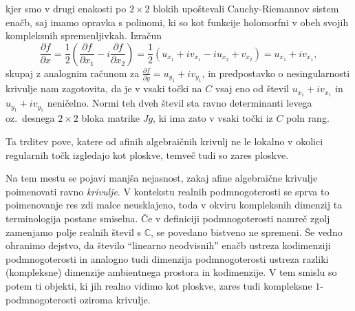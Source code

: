 \documentclass[mat1]{fmfdelo}
\numberwithin{equation}{section}
\newcommand{\R}{\mathbb R}
\newcommand{\C}{\mathbb C}
\newcommand{\pdv}[2][]{\frac{\partial#1}{\partial#2}}
\newcommand{\oz}{oz.\ }
\theoremstyle{definition}
\begin{document}
\begin{dokaz}
    \noindent kjer smo v drugi enakosti po $2 \times 2$ blokih upoštevali Cauchy-Riemannov sistem enačb, saj imamo opravka s polinomi, ki so kot funkcije holomorfni v obeh svojih kompleksnih spremenljivkah. Izračun
    \[
        \pdv[f]{x} = \frac{1}{2} \left( \pdv[f]{x_1} - i\pdv[f]{x_2}\right) = \frac{1}{2} \left( u_{x_1} + i v_{x_1} - i u_{x_2} + v_{x_2}\right) = u_{x_1} + iv_{x_1},
    \]
    skupaj z analognim računom za $\pdv[f]{y} = u_{y_1} + iv_{y_1}$, in predpostavko o nesingularnosti krivulje nam zagotovita, da je v vsaki točki na $C$ vsaj eno od števil $u_{x_1} + iv_{x_1}$ in $u_{y_1} + iv_{y_1}$ neničelno. Normi teh dveh števil sta ravno determinanti levega \oz desnega $2\times 2$ bloka matrike $Jg$, ki ima zato v vsaki točki iz $C$ poln rang.
\end{dokaz}

Ta trditev pove, katere od afinih algebraičnih krivulj ne le lokalno v okolici regularnih točk izgledajo kot ploskve, temveč tudi so zares ploskve. 
\\
\par
Na tem mestu se pojavi manjša nejasnost, zakaj afine algebraične krivulje poimenovati ravno \emph{krivulje}. V kontekstu realnih podmnogoterosti se sprva to poimenovanje res zdi malce neusklajeno, toda v okviru kompleksnih dimenzij ta terminologija postane smiselna. Če v definiciji podmnogoterosti namreč zgolj zamenjamo polje realnih števil s $\C$, se povedano bistveno ne spremeni. Še vedno ohranimo dejstvo, da število ``linearno neodvisnih'' enačb ustreza kodimenziji podmnogoterosti in analogno tudi dimenzija podmnogoterosti ustreza razliki (kompleksne) dimenzije ambientnega prostora in kodimenzije. V tem smislu so potem ti objekti, ki jih realno vidimo kot ploskve, zares tudi kompleksne $1$-podmnogoterosti oziroma krivulje.
\end{document}
